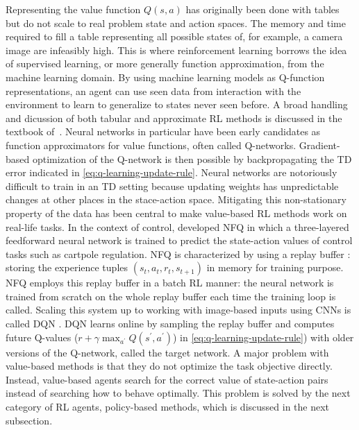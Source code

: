 \documentclass[\home/main.tex]{subfiles}
\begin{document}
Representing the value function $Q(s, a)$ has originally been done with tables \autocite{watkins1992q} but do not scale to real problem state and action spaces. The memory and time required to fill a table representing all possible states of, for example, a camera image are infeasibly high. This is where reinforcement learning borrows the idea of supervised learning, or more generally function approximation, from the machine learning domain. By using machine learning models as Q-function representations, an agent can use seen data from interaction with the environment to learn to generalize to states never seen before. A broad handling and dicussion of both tabular and approximate RL methods is discussed in the textbook of~\textcite{Sutton2018}. Neural networks in particular have been early candidates as function approximators for value functions, often called Q-networks. Gradient-based optimization of the Q-network is then possible by backpropagating the TD error indicated in \cref{eq:q-learning-update-rule}. Neural networks are notoriously difficult to train in an TD setting because updating weights has unpredictable changes at other places in the stace-action space. Mitigating this non-stationary property of the data has been central to make value-based RL methods work on real-life tasks. In the context of control, \textcite{riedmiller2005neural} developed \gls{NFQ} in which a three-layered feedforward neural network is trained to predict the state-action values of control tasks such as cartpole regulation. \Gls{NFQ} is characterized by using a replay buffer  \autocite{lin1992reinforcement}: storing the experience tuples $(s_t, a_t, r_t, s_{t+1})$ in memory for training purpose. \gls{NFQ} employs this replay buffer in a batch RL manner: the neural network is trained from scratch on the whole replay buffer each time the training loop is called. Scaling this system up to working with image-based inputs using \glspl{CNN} is called \gls{DQN} \autocite{mnih2015human}. \Gls{DQN} learns online by sampling the replay buffer and computes future Q-values ($r+\gamma\max _{a^{\prime}} Q\left(s^{\prime}, a^{\prime}\right)$) in \cref{eq:q-learning-update-rule}) with older versions of the Q-network, called the target network. A major problem with value-based methods is that they do not optimize the task objective directly. Instead, value-based agents search for the correct value of state-action pairs instead of searching how to behave optimally. This problem is solved by the next category of RL agents, policy-based methods, which is discussed in the next subsection.
\end{document}
